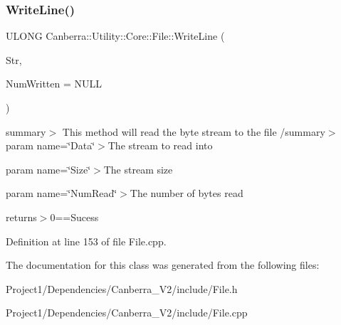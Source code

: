 \subsubsection{\texorpdfstring{Write\+Line()}{WriteLine()}}
{\footnotesize\ttfamily U\+L\+O\+NG Canberra\+::\+Utility\+::\+Core\+::\+File\+::\+Write\+Line (\begin{DoxyParamCaption}\item[{const \hyperlink{class_canberra_1_1_utility_1_1_core_1_1_string}{String} \&}]{Str,  }\item[{U\+L\+O\+NG $\ast$}]{Num\+Written = {\ttfamily NULL} }\end{DoxyParamCaption})}

summary$>$ This method will read the byte stream to the file /summary$>$ param name=\char`\"{}\+Data\char`\"{}$>$The stream to read into

param name=\char`\"{}\+Size\char`\"{}$>$The stream size

param name=\char`\"{}\+Num\+Read\char`\"{}$>$The number of bytes read

returns$>$0==Sucess

Definition at line 153 of file File.\+cpp.



The documentation for this class was generated from the following files\+:\begin{DoxyCompactItemize}
\item 
Project1/\+Dependencies/\+Canberra\+\_\+\+V2/include/File.\+h\item 
Project1/\+Dependencies/\+Canberra\+\_\+\+V2/include/File.\+cpp\end{DoxyCompactItemize}
